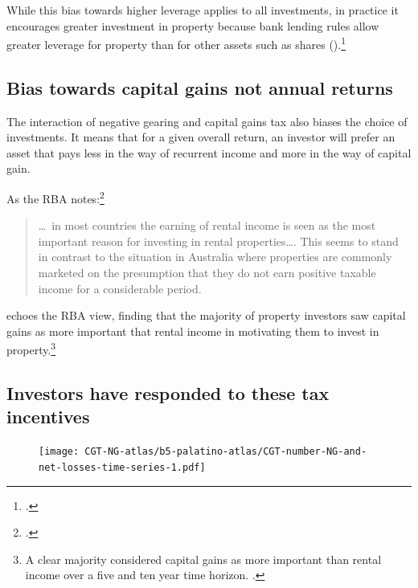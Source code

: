 While this bias towards higher leverage applies to all investments, in practice it encourages greater investment in property because bank lending rules allow greater leverage for property than for other assets such as shares ().\footcite[][23]{RBA2015SubmissionHomeOwnershipInquiry}  


\subsection{Bias towards capital gains not annual returns}
The interaction of negative gearing and capital gains tax also biases the choice of investments. It means that for a given overall return, an investor will prefer an asset that pays less in the way of recurrent income and more in the way of capital gain.

As the RBA notes:\footcite[][42]{RBA2014SubmissionAffordableHousingInquiry}
\begin{quote}
\dots\ in most countries the earning of rental income is seen as the most important reason for investing in rental properties\dots. This seems to stand in contrast to the situation in Australia where properties are commonly marketed on the presumption that they do not earn positive taxable income for a considerable period.
\end{quote}

\textcite{seelig2009understanding} echoes the RBA view, finding that the majority of property investors saw capital gains as more important that rental income in motivating them to invest in property.\footnote{A clear majority considered capital gains as more important than rental income over a five and ten year time horizon. \textcite[][63]{seelig2009understanding}.}

\subsection{Investors have responded to these tax incentives}
\begin{figure}[!t]
\label{fig:number-NG-and-net-losses-time-series}
\texttt{[image: CGT-NG-atlas/b5-palatino-atlas/CGT-number-NG-and-net-losses-time-series-1.pdf]}
\end{figure}


